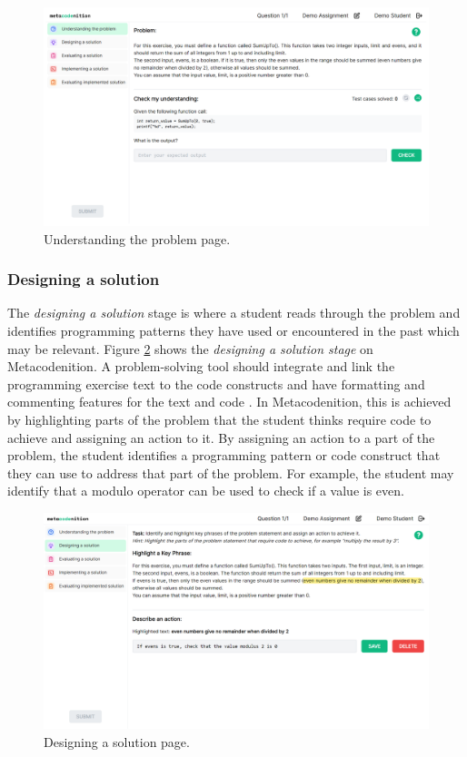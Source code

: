 \documentclass[sigconf,authorversion,nonacm]{acmart}
\begin{document}
\begin{figure}[h!]
  \centering
  \includegraphics[width=\linewidth]{understanding-the-problem}
  \caption{Understanding the problem page.}
  \label{fig:understanding}
\end{figure}

\subsubsection{Designing a solution}
The \emph{designing a solution} stage is where a student reads through the problem and identifies programming patterns they have used or encountered in the past which may be relevant. Figure \ref{fig:designing} shows the \emph{designing a solution stage} on Metacodenition. A problem-solving tool should integrate and link the programming exercise text to the code constructs and have formatting and commenting features for the text and code \cite{saenz2022}. In Metacodenition, this is achieved by highlighting parts of the problem that the student thinks require code to achieve and assigning an action to it. By assigning an action to a part of the problem, the student identifies a programming pattern or code construct that they can use to address that part of the problem. For example, the student may identify that a modulo operator can be used to check if a value is even.

\begin{figure}[h!]
  \centering
  \includegraphics[width=\linewidth]{designing-a-solution}
  \caption{Designing a solution page.}
  \label{fig:designing}
\end{figure}
\end{document}
